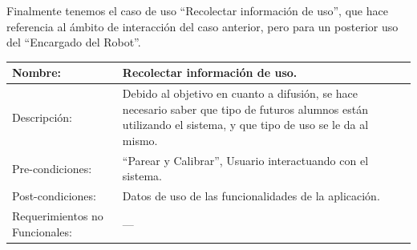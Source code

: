\documentclass[letterpaper,12pt]{article} %
\numberwithin{equation}{section} %
\numberwithin{figure}{section} %
\numberwithin{table}{section} %
\begin{document}
Finalmente tenemos el caso de uso ``Recolectar informaci\'on de uso'', que hace referencia al \'ambito de interacci\'on del caso anterior, pero para un posterior uso del ``Encargado del Robot''.\\

\begin{table}[H]
  \centering
  \begin{tabular}{p{5cm}p{9cm}}\hline\hline
    Nombre: & Recolectar informaci\'on de uso.\\ \hline
    Descripci\'on: & Debido al objetivo en cuanto a difusi\'on, se hace necesario saber que tipo de futuros alumnos est\'an utilizando el sistema, y que tipo de uso se le da al mismo.\\ \hline %
    Pre-condiciones: & ``Parear y Calibrar'', Usuario interactuando con el sistema.\\ \hline
    Post-condiciones: & Datos de uso de las funcionalidades de la aplicaci\'on.\\ \hline
    Requerimientos no Funcionales: & ---\\ \hline\hline %
  \end{tabular}
  \label{tab:Recolectar}
\end{table}
\end{document}
